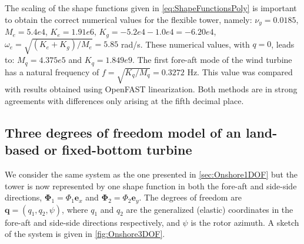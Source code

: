 \documentclass[wes, manuscript]{copernicus}
\renewcommand{\v}[1]{\boldsymbol{#1}}
\begin{document}
The scaling of the shape functions given in \autoref{eq:ShapeFunctionsPoly} is important to obtain the correct numerical values for the flexible tower, namely:
$\nu_y=0.0185$,
$M_e=5.4e4$,
$K_e=1.91e6$,
$K_g=  -5.2e4 -1.0e4 = -6.20e4$,
$\omega_e=\sqrt{(K_e+K_g)/M_e}=5.85$ \unit{rad/s}.
These numerical values, with $q=0$, leads to:
$M_q = 4.375e5$ and $K_q = 1.849e9$.
The first fore-aft mode of the wind turbine has a natural frequency of $f=\sqrt{K_q/M_q}=0.3272$ \unit{Hz}.
This value was compared with results obtained using OpenFAST linearization.
Both methods are in strong agreements with differences only arising at the fifth decimal place.








\subsection{Three degrees of freedom model of an land-based or fixed-bottom turbine}
\label{sec:Onshore3DOF}
We consider the same system as the one presented in \autoref{sec:Onshore1DOF} but 
the tower is now represented by one shape function in both the fore-aft and side-side directions, $\v{\Phi}_1=\Phi_1 \v{e}_x$ and $\v{\Phi}_2=\Phi_2\v{e}_y$.
The degrees of freedom are $\v{q}=(q_1, q_2, \psi)$, where $q_1$ and $q_2$ are the generalized (elastic) coordinates in the fore-aft and side-side directions respectively, and $\psi$ is the rotor azimuth.
A sketch of the system is given in \autoref{fig:Onshore3DOF}. 
\end{document}
